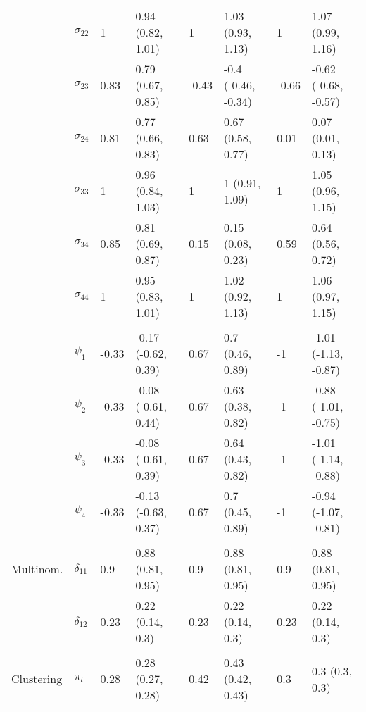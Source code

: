 \documentclass[]{article}
\begin{document}
\begin{table}
\begin{tabular}[t]{llllllll}
\hspace{1em} & $\sigma_{22}$ & 1 & 0.94 (0.82, 1.01) & 1 & 1.03 (0.93, 1.13) & 1 & 1.07 (0.99, 1.16)\\
\hspace{1em} & $\sigma_{23}$ & 0.83 & 0.79 (0.67, 0.85) & -0.43 & -0.4 (-0.46, -0.34) & -0.66 & -0.62 (-0.68, -0.57)\\
\hspace{1em} & $\sigma_{24}$ & 0.81 & 0.77 (0.66, 0.83) & 0.63 & 0.67 (0.58, 0.77) & 0.01 & 0.07 (0.01, 0.13)\\
\hspace{1em} & $\sigma_{33}$ & 1 & 0.96 (0.84, 1.03) & 1 & 1 (0.91, 1.09) & 1 & 1.05 (0.96, 1.15)\\
\hspace{1em} & $\sigma_{34}$ & 0.85 & 0.81 (0.69, 0.87) & 0.15 & 0.15 (0.08, 0.23) & 0.59 & 0.64 (0.56, 0.72)\\
\hspace{1em} & $\sigma_{44}$ & 1 & 0.95 (0.83, 1.01) & 1 & 1.02 (0.92, 1.13) & 1 & 1.06 (0.97, 1.15)\\
\addlinespace[0.3em]
\multicolumn{8}{l}{\textbf{ }}\\
\hspace{1em} & $\psi_{1}$ & -0.33 & -0.17 (-0.62, 0.39) & 0.67 & 0.7 (0.46, 0.89) & -1 & -1.01 (-1.13, -0.87)\\
\hspace{1em} & $\psi_{2}$ & -0.33 & -0.08 (-0.61, 0.44) & 0.67 & 0.63 (0.38, 0.82) & -1 & -0.88 (-1.01, -0.75)\\
\hspace{1em} & $\psi_{3}$ & -0.33 & -0.08 (-0.61, 0.39) & 0.67 & 0.64 (0.43, 0.82) & -1 & -1.01 (-1.14, -0.88)\\
\hspace{1em} & $\psi_{4}$ & -0.33 & -0.13 (-0.63, 0.37) & 0.67 & 0.7 (0.45, 0.89) & -1 & -0.94 (-1.07, -0.81)\\
\addlinespace[0.3em]
\multicolumn{8}{l}{\textbf{ }}\\
\hspace{1em}Multinom. & $\delta_{11}$ & 0.9 & 0.88 (0.81, 0.95) & 0.9 & 0.88 (0.81, 0.95) & 0.9 & 0.88 (0.81, 0.95)\\
\hspace{1em} & $\delta_{12}$ & 0.23 & 0.22 (0.14, 0.3) & 0.23 & 0.22 (0.14, 0.3) & 0.23 & 0.22 (0.14, 0.3)\\
\addlinespace[0.3em]
\multicolumn{8}{l}{\textbf{ }}\\
\hspace{1em}Clustering & $\pi_l$ & 0.28 & 0.28 (0.27, 0.28) & 0.42 & 0.43 (0.42, 0.43) & 0.3 & 0.3 (0.3, 0.3)\\
\bottomrule
\end{tabular}
\end{table}
\end{document}
